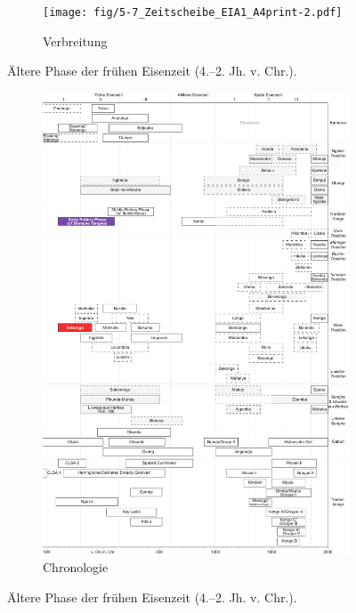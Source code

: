 \begin{figure}[p]
	\centering
	\begin{subfigure}[b]{\textwidth}
		\centering
		\texttt{[image: fig/5-7\_Zeitscheibe\_EIA1\_A4print-2.pdf]}
		\vspace{4cm}
		\caption{Verbreitung}
		\label{fig:EIA1_Karte}
	\end{subfigure}
	\caption{Ältere Phase der frühen Eisenzeit (4.--2. Jh. v. Chr.).}
	\label{}
\end{figure}
\addtocounter{figure}{-1}
\begin{figure}[p]
	\begin{subfigure}[b]{\textwidth}
		\setcounter{subfigure}{1}
		\centering
		\includegraphics[height = .9\textheight]{fig/Chronologiesystem_v4_Zeitscheibe_EIA1.pdf}
		\caption{Chronologie}
		\label{fig:EIA1_Chronologie}
	\end{subfigure}
	\caption{Ältere Phase der frühen Eisenzeit (4.--2. Jh. v. Chr.).}
	\label{fig:EIA1}
\end{figure}

